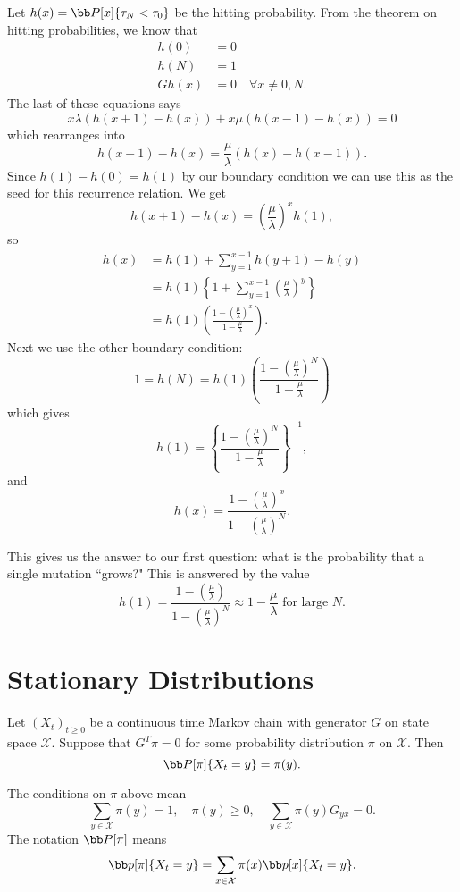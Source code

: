 \documentclass[../../../Master/AppliedStochastics.tex]{subfiles}
\begin{document}
Let $h(x) = \bb P[x] \{\tau_N<\tau_0\}$ be the hitting probability. From the 
theorem 
on hitting probabilities, we know that 
\begin{align*}
	h(0) &= 0 \\
	h(N) &= 1\\
	Gh(x) &= 0 \quad \forall x\neq 0, N.
\end{align*}
The last of these equations says
\[
	x\lambda (h(x+1) - h(x)) + x \mu( h(x-1)-h(x)) = 0
\]
which rearranges into
\[
	h(x+1) - h(x) = \frac{\mu}{\lambda} (h(x) - h(x-1)).
\]
Since $h(1) - h(0) = h(1)$ by our boundary condition we can use this as the 
seed for this recurrence relation. We get
\[
	h(x+1) - h(x) = \left(\frac{\mu}{\lambda}\right)^x h(1),
\]
so
\begin{align*}
	h(x) &= h(1) + \sum_{y=1}^{x-1} h(y+1) - h(y)\\
	&= h(1)\left\{1 + \sum_{y=1}^{x-1} 
	\left(\frac{\mu}{\lambda}\right)^y\right\}\\
	&= h(1) \left(\frac{1- 
	\left(\frac{\mu}{\lambda}\right)^x}{1-\frac{\mu}{\lambda}}\right).
\end{align*}
Next we use the other boundary condition:
\[
	1 = h(N) = h(1)\left(\frac{1- 
	\left(\frac{\mu}{\lambda}\right)^N}{1-\frac{\mu}{\lambda}}\right)
\]
which gives
\[
	h(1) =  \left\{\frac{1- 
	\left(\frac{\mu}{\lambda}\right)^N}{1-\frac{\mu}{\lambda}}\right\}^{-1},
\]
and
\[
	h(x) = \frac{1- \left(\frac{\mu}{\lambda}\right)^x}{1 - 
	\left(\frac{\mu}{\lambda}\right)^N} .
\]

This gives us the answer to our first question: what is the probability that a 
single mutation ``grows?" This is answered by the value 
\[
	h(1) =  \frac{1- \left(\frac{\mu}{\lambda}\right)}{1 - 
	\left(\frac{\mu}{\lambda}\right)^N} \approx 1-\frac{\mu}{\lambda} \text{ 
	for large }N.
\]


\section*{Stationary Distributions} 


\begin{proposition}
Let $(X_t)_{t\geq 0}$ be a continuous time Markov chain with generator $G$ on 
state space $\mathcal{X}$. Suppose that $G^T \pi = 0$ for some probability 
distribution $\pi$ on $\mathcal{X}$. Then
\[
	\bb P[\pi] \{X_t = y\} = \pi(y).
\]
\end{proposition}


The conditions on $\pi$ above mean
\[
	\sum_{y\in \mathcal{X}} \pi(y) = 1, \quad \pi(y)\geq 0, \quad \sum_{y\in 
	\mathcal{X}} \pi(y) G_{yx} = 0.
\]
The notation $\bb P[\pi]$ means
\[
	\bb p[\pi] \{X_t=y\} = \sum_{x\in\mathcal{X}} \pi(x) \bb p[x] \{X_t=y\}.
\]
\end{document}
